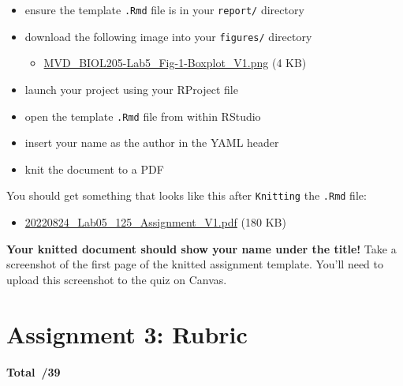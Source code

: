 \documentclass[
]{book}
\providecommand{\tightlist}{%
  \setlength{\itemsep}{0pt}\setlength{\parskip}{0pt}}
\begin{document}
\begin{itemize}
\tightlist
\item
  ensure the template \texttt{.Rmd} file is in your \texttt{report/} directory
\item
  download the following image into your \texttt{figures/} directory

  \begin{itemize}
  \tightlist
  \item
    \href{https://osf.io/download/zuehg}{MVD\_BIOL205-Lab5\_Fig-1-Boxplot\_V1.png} (4 KB)
  \end{itemize}
\item
  launch your project using your RProject file
\item
  open the template \texttt{.Rmd} file from within RStudio
\item
  insert your name as the author in the YAML header
\item
  knit the document to a PDF
\end{itemize}

You should get something that looks like this after \texttt{Knitting} the \texttt{.Rmd} file:

\begin{itemize}
\tightlist
\item
  \href{https://osf.io/download/3k8ve}{20220824\_Lab05\_125\_Assignment\_V1.pdf} (180 KB)
\end{itemize}

\textbf{Your knitted document should show your name under the title!} Take a screenshot of the first page of the knitted assignment template. You'll need to upload this screenshot to the quiz on Canvas.

\hypertarget{assignment-3-rubric}{%
\section*{Assignment 3: Rubric}\label{assignment-3-rubric}}

\textbf{Total~/39}
\end{document}
